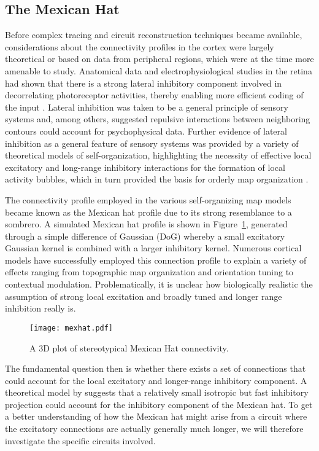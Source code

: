 \subsection{The Mexican Hat} \label{MexicanHat}

Before complex tracing and circuit reconstruction techniques became
available, considerations about the connectivity profiles in the
cortex were largely theoretical or based on data from peripheral
regions, which were at the time more amenable to study. Anatomical
data and electrophysiological studies in the retina had shown that
there is a strong lateral inhibitory component involved in
decorrelating photoreceptor activities, thereby enabling more
efficient coding of the input \citep{Atick1992}. Lateral inhibition
was taken to be a general principle of sensory systems and, among
others, \cite{Blakemore1970} suggested repulsive interactions between
neighboring contours could account for psychophysical data. Further
evidence of lateral inhibition as a general feature of sensory systems
was provided by a variety of theoretical models of self-organization,
highlighting the necessity of effective local excitatory and 
long-range inhibitory interactions for the formation of local activity
bubbles, which in turn provided the basis for orderly map organization
\citep{VonderMalsburg1973,Miller1989}.

The connectivity profile employed in the various self-organizing map
models became known as the Mexican hat profile due to its strong
resemblance to a sombrero. A simulated Mexican hat profile is shown in
Figure~\ref{MexHat}, generated through a simple difference of Gaussian
(DoG) whereby a small excitatory Gaussian kernel is combined with a
larger inhibitory kernel. Numerous cortical models have successfully
employed this connection profile to explain a variety of effects
ranging from topographic map organization and orientation tuning to
contextual modulation. Problematically, it is unclear how biologically
realistic the assumption of strong local excitation and broadly tuned
and longer range inhibition really is.

\begin{figure}
	\centering \texttt{[image: mexhat.pdf]}
	\caption{A 3D plot of stereotypical Mexican Hat connectivity.}
	\label{MexHat}
\end{figure}

The fundamental question then is whether there exists a set of
connections that could account for the local excitatory and
longer-range inhibitory component. A theoretical model by
\cite{Kang2003} suggests that a relatively small isotropic but fast
inhibitory projection could account for the inhibitory component of
the Mexican hat. To get a better understanding of how the Mexican hat
might arise from a circuit where the excitatory connections are
actually generally much longer, we will therefore investigate the specific
circuits involved.


